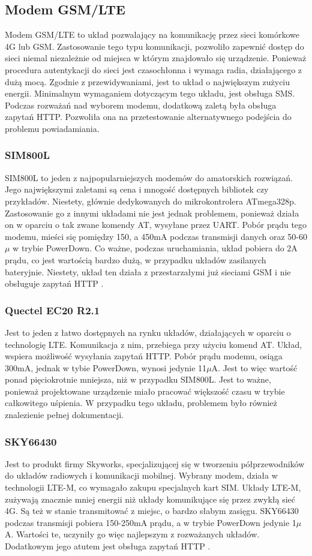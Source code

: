 \subsection{Modem GSM/LTE}
Modem GSM/LTE to układ pozwalający na komunikację przez sieci komórkowe 4G lub GSM. Zastosowanie tego typu komunikacji, pozwoliło zapewnić dostęp do sieci niemal niezależnie od miejsca w którym znajdowało się urządzenie. Ponieważ procedura autentykacji do sieci jest czasochłonna i wymaga radia, działającego z dużą mocą. Zgodnie z przewidywaniami, jest to układ o największym zużyciu energii. Minimalnym wymaganiem dotyczącym tego układu, jest obsługa SMS. Podczas rozważań nad wyborem modemu, dodatkową zaletą była obsługa zapytań HTTP. Pozwoliła ona na przetestowanie alternatywnego podejścia do problemu powiadamiania.

\subsubsection{SIM800L}
SIM800L to jeden z najpopularniejszych modemów do amatorskich rozwiązań. Jego największymi zaletami są cena i mnogość dostępnych bibliotek czy przykładów. Niestety, głównie dedykowanych do mikrokontrolera ATmega328p. Zastosowanie go z innymi układami nie jest jednak problemem, ponieważ działa on w oparciu o tak zwane komendy AT, wysyłane przez UART. Pobór prądu tego modemu, mieści się pomiędzy 150, a 450mA podczas transmisji danych oraz 50-60$\mu$ w trybie PowerDown. Co ważne, podczas uruchamiania, układ pobiera do 2A prądu, co jest wartością bardzo dużą, w przypadku układów zasilanych bateryjnie. Niestety, układ ten działa z przestarzałymi już sieciami GSM i nie obsługuje zapytań HTTP \cite{SIM800L}.

\subsubsection{Quectel EC20 R2.1}
Jest to jeden z łatwo dostępnych na rynku układów, działających w oparciu o technologię LTE. Komunikacja z nim, przebiega przy użyciu komend AT. Układ, wspiera możliwość wysyłania zapytań HTTP. Pobór prądu modemu, osiąga 300mA, jednak w tybie PowerDown, wynosi jedynie 11$\mu$A. Jest to więc wartość ponad pięciokrotnie mniejsza, niż w przypadku SIM800L. Jest to ważne, ponieważ projektowane urządzenie miało pracować większość czasu w trybie całkowitego uśpienia. W przypadku tego układu, problemem było również znalezienie pełnej dokumentacji.

\subsubsection{SKY66430}
Jest to produkt firmy Skyworks, specjalizującej się w tworzeniu półprzewodników do układów radiowych i komunikacji mobilnej. Wybrany modem, działa w technologii LTE-M, co wymagało zakupu specjalnych kart SIM. Układy LTE-M, zużywają znacznie mniej energii niż układy komunikujące się przez zwykłą sieć 4G. Są też w stanie transmitować z miejsc, o bardzo słabym zasięgu. SKY66430 podczas transmisji pobiera 150-250mA prądu, a w trybie PowerDown jedynie 1$\mu$A. Wartości te, uczyniły go więc najlepszym z rozważanych układów. Dodatkowym jego atutem jest obsługa zapytań HTTP \cite{SKY66430}.

